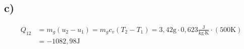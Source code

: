 

\subsection*{c)}
\begin{align*}
    Q_{12} &= m_g (u_2 - u_1) = m_g c_v (T_2 - T_1) = 3,42 \text{g} \cdot 0,623 \frac{\text{J}}{\text{kg} \cdot \text{K}} \cdot (500 \text{K}) \\
    &= -1082,98 \text{J}
\end{align*}